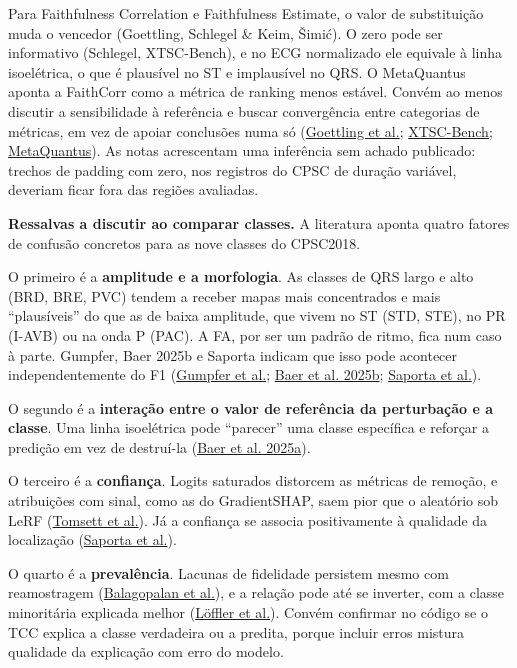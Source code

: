 \documentclass[11pt,a4paper]{article}
\begin{document}
Para Faithfulness Correlation e Faithfulness Estimate, o valor de substituição muda o vencedor (Goettling, Schlegel \& Keim, Šimić). O zero pode ser informativo (Schlegel, XTSC-Bench), e no ECG normalizado ele equivale à linha isoelétrica, o que é plausível no ST e implausível no QRS. O MetaQuantus aponta a FaithCorr como a métrica de ranking menos estável. Convém ao menos discutir a sensibilidade à referência e buscar convergência entre categorias de métricas, em vez de apoiar conclusões numa só (\href{https://pmc.ncbi.nlm.nih.gov/articles/PMC11161651/}{Goettling et al.}; \href{https://arxiv.org/abs/2310.14957}{XTSC-Bench}; \href{https://arxiv.org/abs/2302.07265}{MetaQuantus}). As notas acrescentam uma inferência sem achado publicado: trechos de padding com zero, nos registros do CPSC de duração variável, deveriam ficar fora das regiões avaliadas.

\textbf{Ressalvas a discutir ao comparar classes.} A literatura aponta quatro fatores de confusão concretos para as nove classes do CPSC2018.

O primeiro é a \textbf{amplitude e a morfologia}. As classes de QRS largo e alto (BRD, BRE, PVC) tendem a receber mapas mais concentrados e mais ``plausíveis'' do que as de baixa amplitude, que vivem no ST (STD, STE), no PR (I-AVB) ou na onda P (PAC). A FA, por ser um padrão de ritmo, fica num caso à parte. Gumpfer, Baer 2025b e Saporta indicam que isso pode acontecer independentemente do F1 (\href{https://arxiv.org/abs/2607.24035}{Gumpfer et al.}; \href{https://arxiv.org/abs/2506.11790}{Baer et al. 2025b}; \href{https://asaporta.github.io/assets/pdf/chexlocalize.pdf}{Saporta et al.}).

O segundo é a \textbf{interação entre o valor de referência da perturbação e a classe}. Uma linha isoelétrica pode ``parecer'' uma classe específica e reforçar a predição em vez de destruí-la (\href{https://arxiv.org/abs/2502.17022}{Baer et al. 2025a}).

O terceiro é a \textbf{confiança}. Logits saturados distorcem as métricas de remoção, e atribuições com sinal, como as do GradientSHAP, saem pior que o aleatório sob LeRF (\href{https://arxiv.org/abs/1912.01451}{Tomsett et al.}). Já a confiança se associa positivamente à qualidade da localização (\href{https://asaporta.github.io/assets/pdf/chexlocalize.pdf}{Saporta et al.}).

O quarto é a \textbf{prevalência}. Lacunas de fidelidade persistem mesmo com reamostragem (\href{https://arxiv.org/abs/2205.03295}{Balagopalan et al.}), e a relação pode até se inverter, com a classe minoritária explicada melhor (\href{https://arxiv.org/abs/2203.07861}{Löffler et al.}). Convém confirmar no código se o TCC explica a classe verdadeira ou a predita, porque incluir erros mistura qualidade da explicação com erro do modelo.
\end{document}
